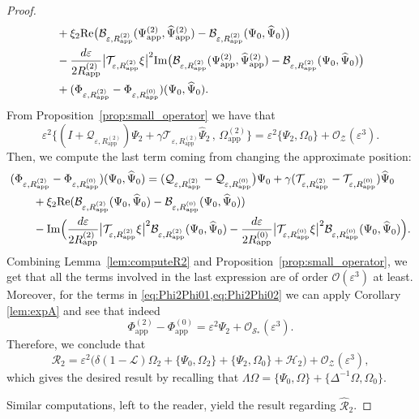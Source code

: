 \documentclass[11pt,reqno,a4paper]{amsart}
\def\eps{\varepsilon}
\def\Re{{\rm Re}}
\def\Im{{\rm Im}}
\newcommand{\cB}{\mathcal{B}}
\newcommand{\cH}{\mathcal{H}}
\newcommand{\cL}{\mathcal{L}}
\newcommand{\cO}{\mathcal{O}}
\newcommand{\cQ}{\mathcal{Q}}
\newcommand{\cR}{\mathcal{R}}
\newcommand{\cS}{\mathcal{S}}
\newcommand{\cT}{\mathcal{T}}
\newcommand{\cZ}{\mathcal{Z}}
\newcommand{\1}{\mathbbm{1}}
\theoremstyle{definition}
\theoremstyle{definition}
\numberwithin{equation}{section}
\newcommand{\Mapp}[2]{#1^{(#2)}_\mathrm{app}}
\begin{document}
\begin{proof}
\begin{align}
      \label{eq:Phi2Phi01}  &+\xi_2\Re\big( \cB_{\eps,\Mapp{R}{2}}(\Mapp{\Psi}{2},\Mapp{\widehat{\Psi}}{2})- \cB_{\eps,\Mapp{R}{2}}(\Psi_0,\widehat{\Psi}_0) \big)\\
        \label{eq:Phi2Phi02}&-\frac{d \eps}{2 \Mapp{R}{2}} \big| \cT_{\eps,\Mapp{R}{2}} \xi\big|^2\Im\big( \cB_{\eps,\Mapp{R}{2}}(\Mapp{\Psi}{2},\Mapp{\widehat{\Psi}}{2})- \cB_{\eps,\Mapp{R}{2}}(\Psi_0,\widehat{\Psi}_0) \big)\\
        &+ (\Phi_{\eps,\Mapp{R}{2}} - \Phi_{\eps,\Mapp{R}{0}})(\Psi_0,\widehat{\Psi}_0).
    \end{align}
    From Proposition~\ref{prop:small_operator} we have that
    \begin{equation}
        \eps^2\big\{( I + \cQ_{\eps,\Mapp{R}{2}}) \Psi_2 + \gamma \cT_{\eps,\Mapp{R}{2}} \widehat{\Psi}_2\, , \, \Mapp{\Omega}{2} \big\}= \eps^2 \{ \Psi_2 , \Omega_0\} + \cO_\cZ(\eps^3). 
    \end{equation}
    Then, we compute the last term coming from changing the approximate position:
    \begin{align}
        &(\Phi_{\eps,\Mapp{R}{2}} - \Phi_{\eps,\Mapp{R}{0}})(\Psi_0,\widehat{\Psi}_0) = (\cQ_{\eps,\Mapp{R}{2}} - \cQ_{\eps,\Mapp{R}{0}} \big)\Psi_0 + \gamma(\cT_{\eps,\Mapp{R}{2}} - \cT_{\eps,\Mapp{R}{0}})\widehat{\Psi}_0 \\
        &\qquad+ \xi_2\Re(\cB_{\eps,\Mapp{R}{2}}(\Psi_0,\widehat{\Psi}_0) - \cB_{\eps,\Mapp{R}{0}}(\Psi_0,\widehat{\Psi}_0) )\\
        &\qquad- \Im\Big( \frac{d\eps}{2\Mapp{R}{2}}\big| \cT_{\eps,\Mapp{R}{2}} \xi \big|^2\cB_{\eps,\Mapp{R}{2}}(\Psi_0,\widehat{\Psi}_0) - \frac{d\eps}{2\Mapp{R}{0}}\big| \cT_{\eps,\Mapp{R}{0}} \xi \big|^2\cB_{\eps,\Mapp{R}{0}}(\Psi_0,\widehat{\Psi}_0)\Big).
    \end{align}
    Combining Lemma~\ref{lem:computeR2} and Proposition~\ref{prop:small_operator}, we get that all the terms involved in the last expression are of order $\cO(\eps^3)$ at least. Moreover, for the terms in \cref{eq:Phi2Phi01,eq:Phi2Phi02} we can apply Corollary \ref{lem:expA}  and see that indeed  \begin{equation}
        \Mapp{\Phi}{2} - \Mapp{\Phi}{0} = \eps^2 \Psi_2  + \cO_{\cS_*}(\eps^3).
    \end{equation}
Therefore, we conclude that
    \begin{equation}
        \cR_2 = \eps^2\Big(\delta(1-\cL)\Omega_2 + \{\Psi_0,\Omega_2 \} + \{\Psi_2,\Omega_0\} + \cH_2 \Big) + \cO_\cZ(\eps^3),
    \end{equation}
    which gives the desired result by recalling that $\Lambda \Omega = \{ \Psi_0,\Omega\} + \{ \Delta^{-1} \Omega , \Omega_0\}$.

    Similar computations, left to the reader, yield the result regarding $\widehat{\cR}_2$.
\end{proof}
\end{document}
